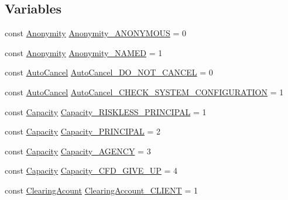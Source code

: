 \subsection*{Variables}
\begin{DoxyCompactItemize}
\item 
const \hyperlink{namespaceMetal_1_1LSE_a0c110efde74bd7f4315615c477dac047}{Anonymity} \hyperlink{namespaceMetal_1_1LSE_aa92238612636f2fcb16bc628b9c66697}{Anonymity\+\_\+\+A\+N\+O\+N\+Y\+M\+O\+U\+S} = 0
\item 
const \hyperlink{namespaceMetal_1_1LSE_a0c110efde74bd7f4315615c477dac047}{Anonymity} \hyperlink{namespaceMetal_1_1LSE_a60b500b4d16e49f2824cedd621534d76}{Anonymity\+\_\+\+N\+A\+M\+E\+D} = 1
\item 
const \hyperlink{namespaceMetal_1_1LSE_a28e46ba33ca9d641a9ea0c63a2e35141}{Auto\+Cancel} \hyperlink{namespaceMetal_1_1LSE_afd539524a799c39ee63a61c5e9725fcb}{Auto\+Cancel\+\_\+\+D\+O\+\_\+\+N\+O\+T\+\_\+\+C\+A\+N\+C\+E\+L} = 0
\item 
const \hyperlink{namespaceMetal_1_1LSE_a28e46ba33ca9d641a9ea0c63a2e35141}{Auto\+Cancel} \hyperlink{namespaceMetal_1_1LSE_ac03ee4f647a20e57b2c09fb9b967160f}{Auto\+Cancel\+\_\+\+C\+H\+E\+C\+K\+\_\+\+S\+Y\+S\+T\+E\+M\+\_\+\+C\+O\+N\+F\+I\+G\+U\+R\+A\+T\+I\+O\+N} = 1
\item 
const \hyperlink{namespaceMetal_1_1LSE_aff7400475e278748e213fefa47bb9b99}{Capacity} \hyperlink{namespaceMetal_1_1LSE_a4b335f580b430c8e4b64c9f3b89c8568}{Capacity\+\_\+\+R\+I\+S\+K\+L\+E\+S\+S\+\_\+\+P\+R\+I\+N\+C\+I\+P\+A\+L} = 1
\item 
const \hyperlink{namespaceMetal_1_1LSE_aff7400475e278748e213fefa47bb9b99}{Capacity} \hyperlink{namespaceMetal_1_1LSE_afa1ee7680ab243d7e2aa0e8f044d9d65}{Capacity\+\_\+\+P\+R\+I\+N\+C\+I\+P\+A\+L} = 2
\item 
const \hyperlink{namespaceMetal_1_1LSE_aff7400475e278748e213fefa47bb9b99}{Capacity} \hyperlink{namespaceMetal_1_1LSE_ae8459ff050a16d8c905e3a24fd16f037}{Capacity\+\_\+\+A\+G\+E\+N\+C\+Y} = 3
\item 
const \hyperlink{namespaceMetal_1_1LSE_aff7400475e278748e213fefa47bb9b99}{Capacity} \hyperlink{namespaceMetal_1_1LSE_ae6c5b8a6229f59c26c8e91b6d970e966}{Capacity\+\_\+\+C\+F\+D\+\_\+\+G\+I\+V\+E\+\_\+\+U\+P} = 4
\item 
const \hyperlink{namespaceMetal_1_1LSE_ae1f2b67d6be84798adfd29525ee0a697}{Clearing\+Acount} \hyperlink{namespaceMetal_1_1LSE_afe26c08c0205e3ee467c5580ed2bd4cc}{Clearing\+Account\+\_\+\+C\+L\+I\+E\+N\+T} = 1
\item 

\end{DoxyCompactItemize}
